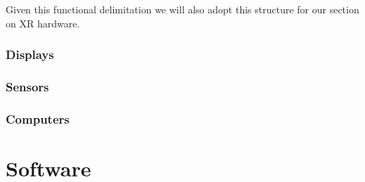 Given this functional delimitation we will also adopt this structure for our section on XR hardware. 

\subsubsection{Displays}

\paragraph{}

\subsubsection{Sensors}
\subsubsection{Computers}





\section{Software}

